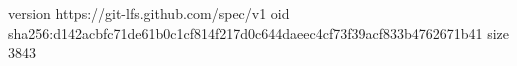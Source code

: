 version https://git-lfs.github.com/spec/v1
oid sha256:d142acbfc71de61b0c1cf814f217d0c644daeec4cf73f39acf833b4762671b41
size 3843
